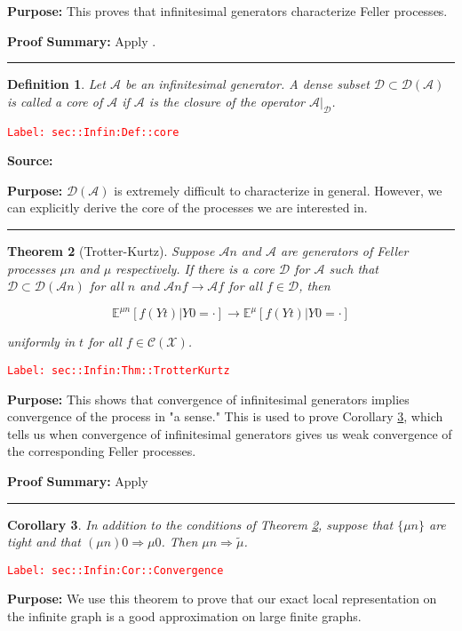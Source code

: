 \documentclass[12pt]{article}
\newcommand{\mb}{\mathbb}
\newcommand{\mc}{\mathcal}
\newcommand{\ra}{\rightarrow}
\newcommand{\tr}{\textcolor{red}}
\newcommand{\labe}[1]{\tr{\texttt{Label: #1}}}
\newcommand{\purpose}{\textbf{Purpose: }}
\newcommand{\pfsum}{\textbf{Proof Summary: }}
\newcommand{\lin}{\rule{\linewidth}{0.4 pt}}
\newcommand{\exmu}[2]{\mb{E}^{#1}\left[#2\right]}	%
\renewcommand{\t}{t}							%
\newcommand{\IG}{\mc{A}}						%
\newcommand{\core}{\mc{D}}						%
\newcommand{\cont}{\mc{C}}						%
\newcommand{\alt}[1]{\widetilde{#1}}			%
\newcommand{\m}{\mu}							%
\newcommand{\XX}{Y}								%
\newcommand{\spce}{\mc{X}}						%
\newtheorem{thms}{Theorem}[section]
\newtheorem{coro}[thms]{Corollary}
\newtheorem{defn}[thms]{Definition}
\begin{document}
\purpose This proves that infinitesimal generators characterize Feller processes.

\pfsum Apply \cite[Theorem 1.5,2.9]{Lig85}.

\lin

\begin{defn}
Let \(\IG{}\) be an infinitesimal generator. A dense subset \(\core\subset \core(\IG{})\) is called a core of \(\IG{}\) if \(\IG{}\) is the closure of the operator \(\IG{}|_\core\).
\label{sec::Infin:Def::core}
\end{defn}
\labe{sec::Infin:Def::core}

\textbf{Source: }\cite[Definition 2.11]{Lig85}

\purpose \(\core(\IG{})\) is extremely difficult to characterize in general. However, we can explicitly derive the core of the processes we are interested in.

\lin

\begin{thms}[Trotter-Kurtz]
Suppose \(\IG{n}\) and \(\IG{}\) are generators of Feller processes \(\m{n}\) and \(\m\) respectively. If there is a core \(\core\) for \(\IG{}\) such that \(\core \subset \mc{D}(\IG{n})\) for all \(n\) and \(\IG{n} f \ra \IG{} f\) for all \(f \in \core\), then 

\[\exmu{\m{n}}{f(\XX{}{\t})|\XX{}{0}=\cdot} \ra \exmu{\mu}{f(\XX{}{\t})|\XX{}{0}=\cdot}\]

uniformly in \(\t\) for all \(f \in \cont(\spce)\).
\label{sec::Infin:Thm::TrotterKurtz}
\end{thms}
\labe{sec::Infin:Thm::TrotterKurtz}

\purpose This shows that convergence of infinitesimal generators implies convergence of the process in "a sense." This is used to prove Corollary \ref{sec::Infin:Cor::Convergence}, which tells us when convergence of infinitesimal generators gives us weak convergence of the corresponding Feller processes.

\pfsum Apply \cite[Theorem 2.12]{Lig85}

\lin

\begin{coro}
In addition to the conditions of Theorem \ref{sec::Infin:Thm::TrotterKurtz}, suppose that \(\{\m{n}\}\) are tight and that \((\m{n}){0} \Rightarrow \m{0}\). Then \(\m{n} \Rightarrow \alt{\m}\).
\label{sec::Infin:Cor::Convergence}
\end{coro}
\labe{sec::Infin:Cor::Convergence}

\purpose We use this theorem to prove that our exact local representation on the infinite graph is a good approximation on large finite graphs.
\end{document}
